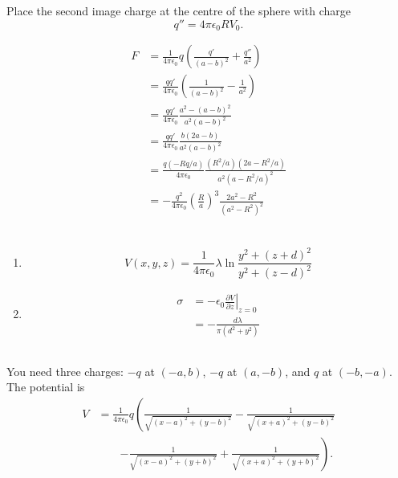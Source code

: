 \documentclass{article}
\newcommand{\ke}{\frac{1}{4 \pi \epsilon_0}}
\begin{document}
\subsection{}

Place the second image charge at the centre of the sphere with charge \[q'' = 4 \pi \epsilon_0 R V_0.\]

\begin{align*}
  F & = \ke q \left( \frac{q'}{(a - b)^2} + \frac{q''}{a^2} \right)                                  \\
    & = \frac{q q'}{4 \pi \epsilon_0} \left( \frac{1}{(a - b)^2} - \frac{1}{a^2} \right)             \\
    & = \frac{q q'}{4 \pi \epsilon_0} \frac{a^2 - (a - b)^2}{a^2 (a - b)^2}                          \\
    & = \frac{q q'}{4 \pi \epsilon_0} \frac{b (2 a - b)}{a^2 (a - b)^2}                              \\
    & = \frac{q (-R q / a)}{4 \pi \epsilon_0} \frac{(R^2 / a) (2 a - R^2 / a)}{a^2 (a - R^2 / a)^2}  \\
    & = -\frac{q^2}{4 \pi \epsilon_0} \left( \frac{R}{a} \right)^3 \frac{2 a^2 - R^2}{(a^2 - R^2)^2} \\
\end{align*}

\subsection{}

\begin{enumerate}
  \item \[V(x, y, z) = \ke \lambda \ln \frac{y^2 + (z + d)^2}{y^2 + (z - d)^2}\]

  \item

        \begin{align*}
          \sigma & = -\epsilon_0 \left. \frac{\partial V}{\partial z} \right|_{z = 0} \\
                 & = -\frac{d \lambda}{\pi (d^2 + y^2)}
        \end{align*}
\end{enumerate}

\subsection{}

You need three charges: $-q$ at $(-a, b)$, $-q$ at $(a, -b)$, and $q$ at $(-b, -a)$. The potential is \begin{align*}
  V & = \ke q \left( \frac{1}{\sqrt{(x - a)^2 + (y - b)^2}} - \frac{1}{\sqrt{(x + a)^2 + (y - b)^2}} \right.   \\
    & \qquad \left. - \frac{1}{\sqrt{(x - a)^2 + (y + b)^2}} + \frac{1}{\sqrt{(x + a)^2 + (y + b)^2}} \right).
\end{align*}
\end{document}
